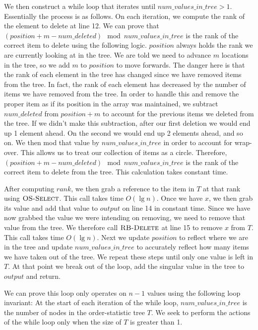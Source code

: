 \documentclass[11pt]{article}
\begin{document}
We then construct a while loop that iterates until $num\_values\_in\_tree > 1$. Essentially the process is as follows. On each iteration, we compute the rank of the element to delete at line 12. We can prove that $(position + m - num\_deleted) \mod num\_values\_in\_tree$ is the rank of the correct item to delete using the following logic. $position$ always holds the rank we are currently looking at in the tree. We are told we need to advance $m$ locations in the tree, so we add $m$ to $position$ to move forwards. The danger here is that the rank of each element in the tree has changed since we have removed items from the tree. In fact, the rank of each element has decreased by the number of items we have removed from the tree. In order to handle this and remove the proper item as if its position in the array was maintained, we subtract $num\_deleted$ from $position + m$ to account for the previous items we deleted from the tree. If we didn't make this subtraction, after our first deletion we would end up 1 element ahead. On the second we would end up 2 elements ahead, and so on. We then mod that value by $num\_values\_in\_tree$ in order to account for wrap-over. This allows us to treat our collection of items as a circle. Therefore, $(position + m - num\_deleted) \mod num\_values\_in\_tree$ is the rank of the correct item to delete from the tree. This calculation takes constant time.

After computing $rank$, we then grab a reference to the item in $T$ at that rank using $\textnormal{\scshape OS-Select}$. This call takes time $O(\lg{n})$. Once we have $x$, we then grab its value and add that value to $output$ on line 14 in constant time. Since we have now grabbed the value we were intending on removing, we need to remove that value from the tree. We therefore call $\textnormal{\scshape RB-Delete}$ at line 15 to remove $x$ from $T$. This call takes time $O(\lg{n})$. Next we update $position$ to reflect where we are in the tree and update $num\_values\_in\_tree$ to accurately reflect how many items we have taken out of the tree. We repeat these steps until only one value is left in $T$. At that point we break out of the loop, add the singular value in the tree to $output$ and return.

We can prove this loop only operates on $n-1$ values using the following loop invariant: At the start of each iteration of the while loop, $num\_values\_in\_tree$ is the number of nodes in the order-statistic tree $T$. We seek to perform the actions of the while loop only when the size of $T$ is greater than 1.
\end{document}

